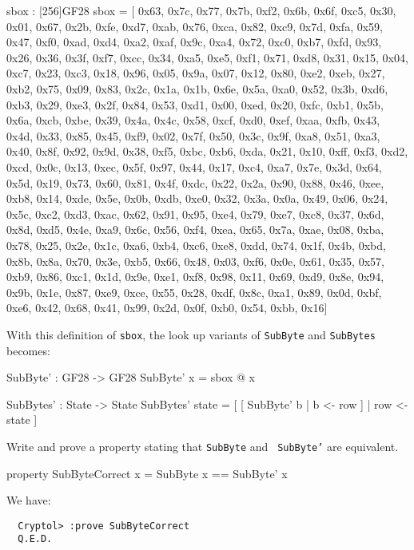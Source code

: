 \vspace{0.25cm}
\begin{minipage}{\textwidth}
{\footnotesize
\begin{code}
  sbox : [256]GF28
  sbox = [
     0x63, 0x7c, 0x77, 0x7b, 0xf2, 0x6b, 0x6f, 0xc5, 0x30, 0x01, 0x67,
     0x2b, 0xfe, 0xd7, 0xab, 0x76, 0xca, 0x82, 0xc9, 0x7d, 0xfa, 0x59,
     0x47, 0xf0, 0xad, 0xd4, 0xa2, 0xaf, 0x9c, 0xa4, 0x72, 0xc0, 0xb7,
     0xfd, 0x93, 0x26, 0x36, 0x3f, 0xf7, 0xcc, 0x34, 0xa5, 0xe5, 0xf1,
     0x71, 0xd8, 0x31, 0x15, 0x04, 0xc7, 0x23, 0xc3, 0x18, 0x96, 0x05,
     0x9a, 0x07, 0x12, 0x80, 0xe2, 0xeb, 0x27, 0xb2, 0x75, 0x09, 0x83,
     0x2c, 0x1a, 0x1b, 0x6e, 0x5a, 0xa0, 0x52, 0x3b, 0xd6, 0xb3, 0x29,
     0xe3, 0x2f, 0x84, 0x53, 0xd1, 0x00, 0xed, 0x20, 0xfc, 0xb1, 0x5b,
     0x6a, 0xcb, 0xbe, 0x39, 0x4a, 0x4c, 0x58, 0xcf, 0xd0, 0xef, 0xaa,
     0xfb, 0x43, 0x4d, 0x33, 0x85, 0x45, 0xf9, 0x02, 0x7f, 0x50, 0x3c,
     0x9f, 0xa8, 0x51, 0xa3, 0x40, 0x8f, 0x92, 0x9d, 0x38, 0xf5, 0xbc,
     0xb6, 0xda, 0x21, 0x10, 0xff, 0xf3, 0xd2, 0xcd, 0x0c, 0x13, 0xec,
     0x5f, 0x97, 0x44, 0x17, 0xc4, 0xa7, 0x7e, 0x3d, 0x64, 0x5d, 0x19,
     0x73, 0x60, 0x81, 0x4f, 0xdc, 0x22, 0x2a, 0x90, 0x88, 0x46, 0xee,
     0xb8, 0x14, 0xde, 0x5e, 0x0b, 0xdb, 0xe0, 0x32, 0x3a, 0x0a, 0x49,
     0x06, 0x24, 0x5c, 0xc2, 0xd3, 0xac, 0x62, 0x91, 0x95, 0xe4, 0x79,
     0xe7, 0xc8, 0x37, 0x6d, 0x8d, 0xd5, 0x4e, 0xa9, 0x6c, 0x56, 0xf4,
     0xea, 0x65, 0x7a, 0xae, 0x08, 0xba, 0x78, 0x25, 0x2e, 0x1c, 0xa6,
     0xb4, 0xc6, 0xe8, 0xdd, 0x74, 0x1f, 0x4b, 0xbd, 0x8b, 0x8a, 0x70,
     0x3e, 0xb5, 0x66, 0x48, 0x03, 0xf6, 0x0e, 0x61, 0x35, 0x57, 0xb9,
     0x86, 0xc1, 0x1d, 0x9e, 0xe1, 0xf8, 0x98, 0x11, 0x69, 0xd9, 0x8e,
     0x94, 0x9b, 0x1e, 0x87, 0xe9, 0xce, 0x55, 0x28, 0xdf, 0x8c, 0xa1,
     0x89, 0x0d, 0xbf, 0xe6, 0x42, 0x68, 0x41, 0x99, 0x2d, 0x0f, 0xb0,
     0x54, 0xbb, 0x16]
\end{code}
}
\end{minipage}

\noindent With this definition of {\tt sbox}, the look up variants of
{\tt SubByte} and {\tt SubBytes} becomes:\label{aes:subbytetl}
\begin{code}
  SubByte' : GF28 -> GF28
  SubByte' x = sbox @ x

  SubBytes' : State -> State
  SubBytes' state = [ [ SubByte' b | b <- row ] | row <- state ]
\end{code}

\begin{Exercise}\label{ex:sbox}
  Write and prove a property stating that {\tt SubByte} and {\tt
    SubByte'} are equivalent.
\end{Exercise}
\begin{Answer}
\begin{code}
  property SubByteCorrect x = SubByte x == SubByte' x
\end{code}
We have:
\begin{Verbatim}
  Cryptol> :prove SubByteCorrect
  Q.E.D.
\end{Verbatim}
\end{Answer}

